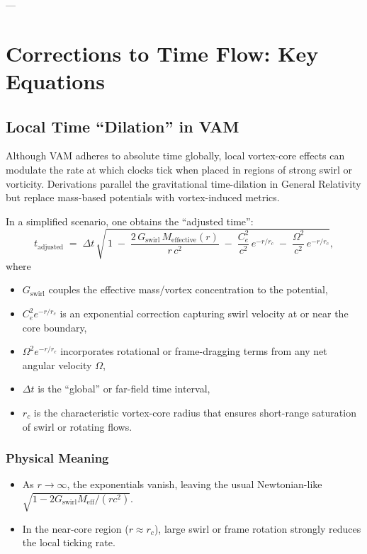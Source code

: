 \documentclass[aps,preprint,superscriptaddress]{revtex4-2}
\begin{document}
    ---

    \section{Corrections to Time Flow: Key Equations}

    \subsection{Local Time “Dilation” in VAM}
    Although VAM adheres to absolute time globally, local vortex-core effects can modulate the rate at which clocks tick when placed in regions of strong swirl or vorticity. Derivations parallel the gravitational time-dilation in General Relativity but replace mass-based potentials with vortex-induced metrics.

    In a simplified scenario, one obtains the “adjusted time”:
    \[
        t_{\text{adjusted}}
        \;=\;
        \Delta t \,\sqrt{\,1 \;-\; \frac{2\,G_{\text{swirl}}\,M_{\text{effective}}(r)}{r\,c^2}
        \;-\;
        \frac{C_e^2}{c^2} \, e^{-r/r_c}
            \;-\;
            \frac{\Omega^2}{c^2} \, e^{-r/r_c}
        },
    \]
    where
    \begin{itemize}
        \item \(G_{\text{swirl}}\) couples the effective mass/vortex concentration to the potential,
        \item \(C_e^2 e^{-r/r_c}\) is an exponential correction capturing swirl velocity at or near the core boundary,
        \item \(\Omega^2 e^{-r/r_c}\) incorporates rotational or frame-dragging terms from any net angular velocity \(\Omega\),
        \item \(\Delta t\) is the “global” or far-field time interval,
        \item \(r_c\) is the characteristic vortex-core radius that ensures short-range saturation of swirl or rotating flows.
    \end{itemize}

    \subsubsection{Physical Meaning}
    \begin{itemize}
        \item As \(r \to \infty\), the exponentials vanish, leaving the usual Newtonian-like \(\sqrt{1 - 2G_{\text{swirl}} M_{\text{eff}} / (rc^2)}\).
        \item In the near-core region (\(r \approx r_c\)), large swirl or frame rotation strongly reduces the local ticking rate.
    \end{itemize}
\end{document}
